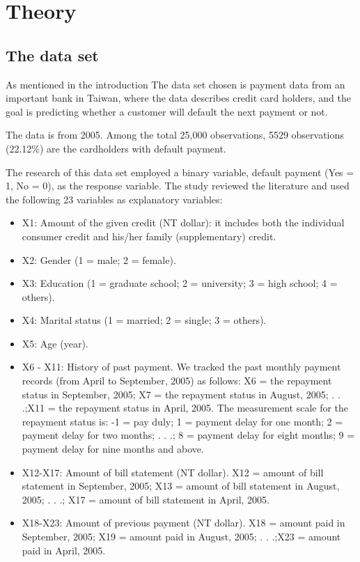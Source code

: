 \section{Theory}
\subsection{The data set}
As mentioned in the introduction The data set chosen is payment data 
from an important bank in Taiwan, where the data describes credit card holders,
and the goal is predicting whether a customer will default the next 
payment or not.

The data is from 2005. Among the total 25,000 observations, 5529 observations
(22.12\%) are the cardholders with default payment.~\cite{ComparisonData} 

The research of this data set  employed a binary variable, default payment 
(Yes = 1, No = 0), as the response variable. The study reviewed the 
literature and used the following 23 variables as explanatory variables: 
\begin{itemize}
		\item
X1: Amount of the given credit (NT dollar): it includes both the individual consumer credit and his/her family (supplementary) credit. 
\item
X2: Gender (1 = male; 2 = female). 
\item
X3: Education (1 = graduate school; 2 = university; 3 = high school; 4 = others). 
\item
X4: Marital status (1 = married; 2 = single; 3 = others). 
\item
X5: Age (year).
\item
X6 - X11: History of past payment. We tracked the past monthly payment records (from April to September, 2005) as follows: X6 = the repayment status in September, 2005; X7 = the repayment status in August, 2005; . . .;X11 = the repayment status in April, 2005. The measurement scale for the repayment status is: -1 = pay duly; 1 = payment delay for one month; 2 = payment delay for two months; . . .; 8 = payment delay for eight months; 9 = payment delay for nine months and above. 
\item
X12-X17: Amount of bill statement (NT dollar). X12 = amount of bill statement in September, 2005; X13 = amount of bill statement in August, 2005; . . .; X17 = amount of bill statement in April, 2005. 
\item
X18-X23: Amount of previous payment (NT dollar). X18 = amount paid in September, 2005; X19 = amount paid in August, 2005; . . .;X23 = amount paid in April, 2005. 
\end{itemize} ~\cite{CreditCardData} 



